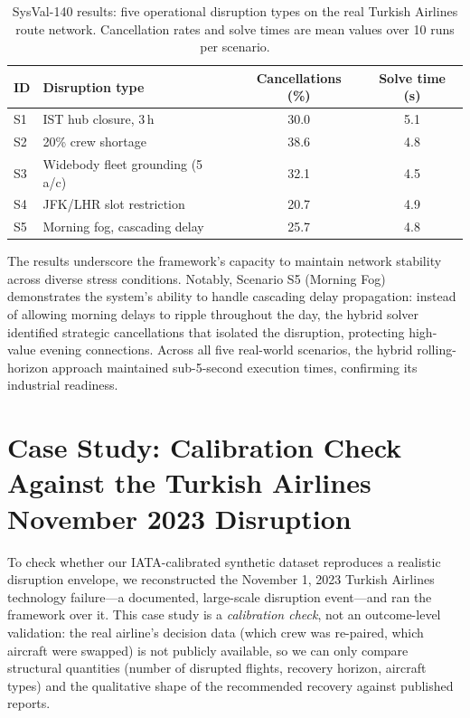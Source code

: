\documentclass[12pt,number]{elsarticle}
\begin{document}
\begin{table}[H]
\centering
\caption{SysVal-140 results: five operational disruption types on the real Turkish Airlines route network. Cancellation rates and solve times are mean values over 10 runs per scenario.}
\label{tab:sys_val}
\begin{tabular}{@{}llcc@{}}
\toprule
\textbf{ID} & \textbf{Disruption type} & \textbf{Cancellations (\%)} & \textbf{Solve time (s)} \\
\midrule
S1 & IST hub closure, 3\,h           & 30.0 & 5.1 \\
S2 & 20\% crew shortage              & 38.6 & 4.8 \\
S3 & Widebody fleet grounding (5 a/c)& 32.1 & 4.5 \\
S4 & JFK/LHR slot restriction         & 20.7 & 4.9 \\
S5 & Morning fog, cascading delay     & 25.7 & 4.8 \\
\bottomrule
\end{tabular}
\end{table}

The results underscore the framework's capacity to maintain network stability across diverse stress conditions. Notably, Scenario S5 (Morning Fog) demonstrates the system's ability to handle cascading delay propagation: instead of allowing morning delays to ripple throughout the day, the hybrid solver identified strategic cancellations that isolated the disruption, protecting high-value evening connections. Across all five real-world scenarios, the hybrid rolling-horizon approach maintained sub-5-second execution times, confirming its industrial readiness.

\section{Case Study: Calibration Check Against the Turkish Airlines November 2023 Disruption}
\label{sec:casestudy}

To check whether our IATA-calibrated synthetic dataset reproduces a realistic disruption envelope, we reconstructed the November 1, 2023 Turkish Airlines technology failure---a documented, large-scale disruption event---and ran the framework over it. This case study is a \emph{calibration check}, not an outcome-level validation: the real airline's decision data (which crew was re-paired, which aircraft were swapped) is not publicly available, so we can only compare structural quantities (number of disrupted flights, recovery horizon, aircraft types) and the qualitative shape of the recommended recovery against published reports.
\end{document}
